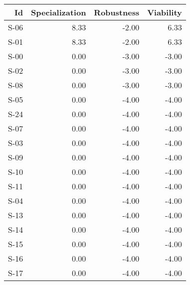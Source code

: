 \begin{tabular}{ | r | r | r | r | }
    \hline
                    Id  &  Specialization  &      Robustness  &       Viability  \\
    \hline
    \hline
                  S-06  &            8.33  &           -2.00  &            6.33  \\
    \hline
                  S-01  &            8.33  &           -2.00  &            6.33  \\
    \hline
                  S-00  &            0.00  &           -3.00  &           -3.00  \\
    \hline
                  S-02  &            0.00  &           -3.00  &           -3.00  \\
    \hline
                  S-08  &            0.00  &           -3.00  &           -3.00  \\
    \hline
                  S-05  &            0.00  &           -4.00  &           -4.00  \\
    \hline
                  S-24  &            0.00  &           -4.00  &           -4.00  \\
    \hline
                  S-07  &            0.00  &           -4.00  &           -4.00  \\
    \hline
                  S-03  &            0.00  &           -4.00  &           -4.00  \\
    \hline
                  S-09  &            0.00  &           -4.00  &           -4.00  \\
    \hline
                  S-10  &            0.00  &           -4.00  &           -4.00  \\
    \hline
                  S-11  &            0.00  &           -4.00  &           -4.00  \\
    \hline
                  S-04  &            0.00  &           -4.00  &           -4.00  \\
    \hline
                  S-13  &            0.00  &           -4.00  &           -4.00  \\
    \hline
                  S-14  &            0.00  &           -4.00  &           -4.00  \\
    \hline
                  S-15  &            0.00  &           -4.00  &           -4.00  \\
    \hline
                  S-16  &            0.00  &           -4.00  &           -4.00  \\
    \hline
                  S-17  &            0.00  &           -4.00  &           -4.00  \\

\end{tabular}
